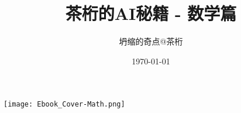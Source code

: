 \documentclass[oneside]{book}
\title{茶桁的AI秘籍 - 数学篇}
\author{坍缩的奇点@茶桁}
\date{\today}
\begin{document}

\begin{titlepage}
  \centering
  \texttt{[image: Ebook\_Cover-Math.png]}
\end{titlepage}


\tableofcontents




























\end{document}
